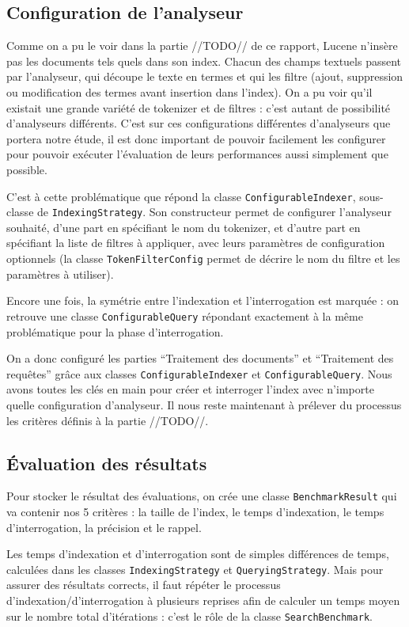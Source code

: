 \subsection{Configuration de l'analyseur}

Comme on a pu le voir dans la partie //TODO// de ce rapport, Lucene n’insère pas les documents tels quels dans son index. Chacun des champs textuels passent par l’analyseur, qui découpe le texte en termes et qui les filtre (ajout, suppression ou modification des termes avant insertion dans l’index). On a pu voir qu’il existait une grande variété de tokenizer et de filtres : c’est autant de possibilité d’analyseurs différents. C’est sur ces configurations différentes d’analyseurs que portera notre étude, il est donc important de pouvoir facilement les configurer pour pouvoir exécuter l’évaluation de leurs performances aussi simplement que possible.

C’est à cette problématique que répond la classe \texttt{ConfigurableIndexer}, sous-classe de \texttt{IndexingStrategy}. Son constructeur permet de configurer l’analyseur souhaité, d’une part en spécifiant le nom du tokenizer, et d’autre part en spécifiant la liste de filtres à appliquer, avec leurs paramètres de configuration optionnels (la classe \texttt{TokenFilterConfig} permet de décrire le nom du filtre et les paramètres à utiliser).

Encore une fois, la symétrie entre l’indexation et l’interrogation est marquée : on retrouve une classe \texttt{ConfigurableQuery} répondant exactement à la même problématique pour la phase d’interrogation.

On a donc configuré les parties “Traitement des documents” et “Traitement des requêtes” grâce aux classes \texttt{ConfigurableIndexer} et \texttt{ConfigurableQuery}. Nous avons toutes les clés en main pour créer et interroger l’index avec n’importe quelle configuration d’analyseur. Il nous reste maintenant à prélever du processus les critères définis à la partie //TODO//.

\subsection{Évaluation des résultats}

Pour stocker le résultat des évaluations, on crée une classe \texttt{BenchmarkResult} qui va contenir nos 5 critères : la taille de l’index, le temps d’indexation, le temps d’interrogation, la précision et le rappel.


Les temps d’indexation et d’interrogation sont de simples différences de temps, calculées dans les classes \texttt{IndexingStrategy} et \texttt{QueryingStrategy}. Mais pour assurer des résultats corrects, il faut répéter le processus d’indexation/d’interrogation à plusieurs reprises afin de calculer un temps moyen sur le nombre total d’itérations : c’est le rôle de la classe \texttt{SearchBenchmark}.

